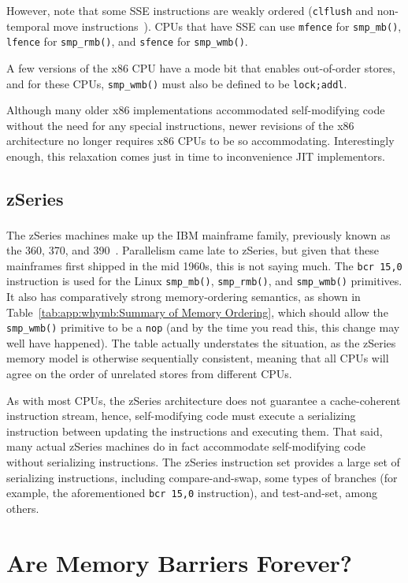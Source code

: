 However, note that some SSE instructions are weakly ordered ({\tt clflush}
and non-temporal move instructions~\cite{IntelXeonV2b-96a}).
CPUs that have SSE can use {\tt mfence} for {\tt smp\_mb()},
{\tt lfence} for {\tt smp\_rmb()}, and {\tt sfence} for {\tt smp\_wmb()}.

A few versions of the x86 CPU have a mode bit that enables out-of-order
stores, and for these CPUs, {\tt smp\_wmb()} must also be defined to
be {\tt lock;addl}.

Although many older x86 implementations accommodated self-modifying
code without the need for any special instructions, newer revisions of
the x86 architecture no longer requires x86 CPUs to be so accommodating.
Interestingly enough, this relaxation comes just in time to inconvenience
JIT implementors.

\subsection{zSeries}

The zSeries machines make up the IBM\textsuperscript{\texttrademark}
mainframe family, previously
known as the 360, 370, and 390~\cite{IBMzSeries04a}.
Parallelism came late to zSeries, but given that these mainframes first
shipped in the mid 1960s, this is not saying much.
The {\tt bcr 15,0} instruction is used for the Linux {\tt smp\_mb()},
{\tt smp\_rmb()}, and {\tt smp\_wmb()} primitives.
It also has comparatively strong memory-ordering semantics, as shown in
Table~\ref{tab:app:whymb:Summary of Memory Ordering}, which should allow the
{\tt smp\_wmb()} primitive to be a {\tt nop} (and by the time you read this,
this change may well have happened).
The table actually understates the situation, as the zSeries memory model
is otherwise sequentially consistent, meaning that all CPUs
will agree on the order of unrelated stores from different CPUs.

As with most CPUs, the zSeries architecture does not guarantee a
cache-coherent instruction stream, hence,
self-modifying code must execute a serializing instruction between updating
the instructions and executing them.
That said, many actual zSeries machines do in fact accommodate self-modifying
code without serializing instructions.
The zSeries instruction set provides a large set of serializing instructions,
including compare-and-swap, some types of branches (for example, the
aforementioned {\tt bcr 15,0} instruction), and test-and-set,
among others.

\section{Are Memory Barriers Forever?}
\label{sec:app:whymb:Are Memory Barriers Forever?}

